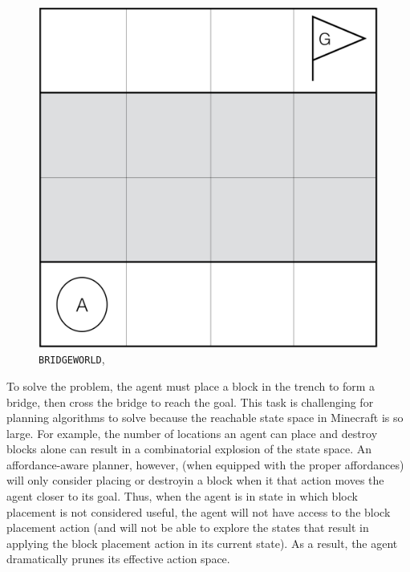 \documentclass[]{article}
\begin{document}
\begin{figure}
\centering
\includegraphics[scale=0.2]{figures/bridgeworld.png}
\caption{\texttt{BRIDGEWORLD},
\label{fig:bridgeworld}}
\end{figure}

To solve the problem, the agent must place a block in the trench to
form a bridge, then cross the bridge to reach the goal.  This task is
challenging for planning algorithms to solve because the reachable
state space in Minecraft is so large. For example, the number of
locations an agent can place and destroy blocks alone can result in a
combinatorial explosion of the state space. An affordance-aware
planner, however, (when equipped with the proper affordances) will
only consider placing or destroyin a block when it that action moves
the agent closer to its goal. Thus, when the agent is in state in
which block placement is not considered useful, the agent will not
have access to the block placement action (and will not be able to
explore the states that result in applying the block placement action
in its current state). As a result, the agent dramatically prunes its
effective action space.


\end{document}
